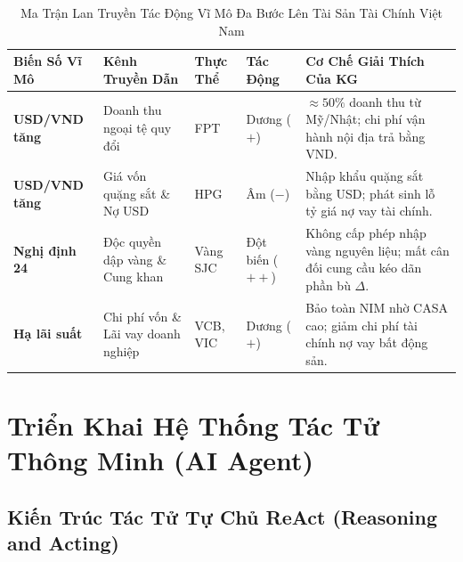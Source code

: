 \documentclass[12pt,a4paper]{report}
\begin{document}
\begin{table}[H]
\centering
\small
\renewcommand{\arraystretch}{1.15}
\caption{Ma Trận Lan Truyền Tác Động Vĩ Mô Đa Bước Lên Tài Sản Tài Chính Việt Nam}
\label{tab:financial_macro_impact}
\begin{tabularx}{\textwidth}{>{\RaggedRight\arraybackslash\bfseries}p{2.6cm} >{\RaggedRight\arraybackslash}p{2.6cm} >{\centering\arraybackslash}p{1.6cm} >{\centering\arraybackslash}p{1.6cm} Y}
\toprule
\textbf{Biến Số Vĩ Mô} & \textbf{Kênh Truyền Dẫn} & \textbf{Thực Thể} & \textbf{Tác Động} & \textbf{Cơ Chế Giải Thích Của KG} \\
\midrule
USD/VND tăng & Doanh thu ngoại tệ quy đổi & FPT & Dương ($+$) & $\approx 50\%$ doanh thu từ Mỹ/Nhật; chi phí vận hành nội địa trả bằng VND. \\
USD/VND tăng & Giá vốn quặng sắt \& Nợ USD & HPG & Âm ($-$) & Nhập khẩu quặng sắt bằng USD; phát sinh lỗ tỷ giá nợ vay tài chính. \\
Nghị định 24 & Độc quyền dập vàng \& Cung khan & Vàng SJC & Đột biến ($++$) & Không cấp phép nhập vàng nguyên liệu; mất cân đối cung cầu kéo dãn phần bù $\Delta$. \\
Hạ lãi suất & Chi phí vốn \& Lãi vay doanh nghiệp & VCB, VIC & Dương ($+$) & Bảo toàn NIM nhờ CASA cao; giảm chi phí tài chính nợ vay bất động sản. \\
\bottomrule
\end{tabularx}
\end{table}

\newpage

\chapter{Triển Khai Hệ Thống Tác Tử Thông Minh (AI Agent)}

\section{Kiến Trúc Tác Tử Tự Chủ ReAct (Reasoning and Acting)}
\end{document}
